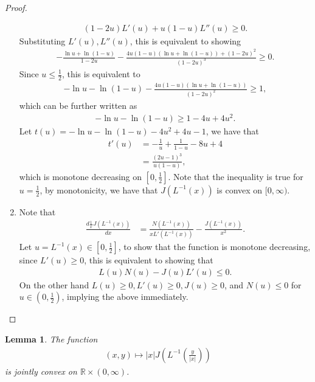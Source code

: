 \documentclass[conference,letterpaper,onecolumn]{IEEEtran}
\theoremstyle{plain}%
\newtheorem{lemma}[thm]{Lemma}
\begin{document}
\begin{proof}
\begin{enumerate}
\begin{align*}
        (1 - 2u)L'(u) + u(1-u)L''(u)\geq 0.
    \end{align*}
    Substituting $L'(u),L''(u)$, this is equivalent to showing
    \begin{align*}
        -\frac{\ln u + \ln(1-u)}{1-2u} - \frac{4u(1-u)(\ln u + \ln(1-u)) + (1-2u)^2}{(1 - 2u)^3} \geq 0.
    \end{align*}
    Since $u \leq \frac{1}{2}$, this is equivalent to
    \begin{align*}
        -\ln u - \ln(1-u) - \frac{4u(1-u)(\ln u + \ln(1-u))}{(1 - 2u)^2} \geq 1,
    \end{align*}
    which can be further written as
    \begin{align*}
        -\ln u - \ln(1-u) \geq 1 - 4u + 4u^2.
    \end{align*}
    Let $t(u) = -\ln u - \ln(1 - u)  -4u^2 + 4u - 1$, we have that
    \begin{align*}
        t'(u) &= -\frac{1}{u} + \frac{1}{1 - u} - 8u + 4\\
        &= \frac{(2u - 1)^3}{u(1-u)},
    \end{align*}
    which is monotone decreasing on $\left[0,\frac{1}{2}\right]$. Note that the inequality is true for $u = \frac{1}{2}$, by monotonicity, we have that $J(L^{-1}(x))$ is convex on $[0,\infty)$.
    \item Note that
    \begin{align*}
        \frac{d \frac{1}{x}J(L^{-1}(x))}{dx}&= \frac{N(L^{-1}(x))}{xL'(L^{-1}(x))} - \frac{J(L^{-1}(x))}{x^2}.
    \end{align*}
    Let $u = L^{-1}(x) \in \left[0,\frac{1}{2}\right]$, to show that the function is monotone decreasing, since $L'(u) \geq 0$, this is equivalent to showing that
    \begin{align*}
        L(u)N(u) - J(u)L'(u) \leq 0.
    \end{align*}
    On the other hand $L(u) \geq 0, L'(u) \geq 0, J(u) \geq 0$, and $N(u) \leq 0$ for $u \in (0,\frac 12)$, implying the above immediately.
    \end{enumerate}
\end{proof}
\begin{lemma} \label{corap1}The function
    \begin{align}
       (x,y)\mapsto |x|J\left(L^{-1}\left(\frac{y}{|x|}\right)\right)\label{lxy} 
    \end{align}
is jointly convex on $\mathbb{R}\times (0,\infty)$.
\end{lemma}
\end{document}
